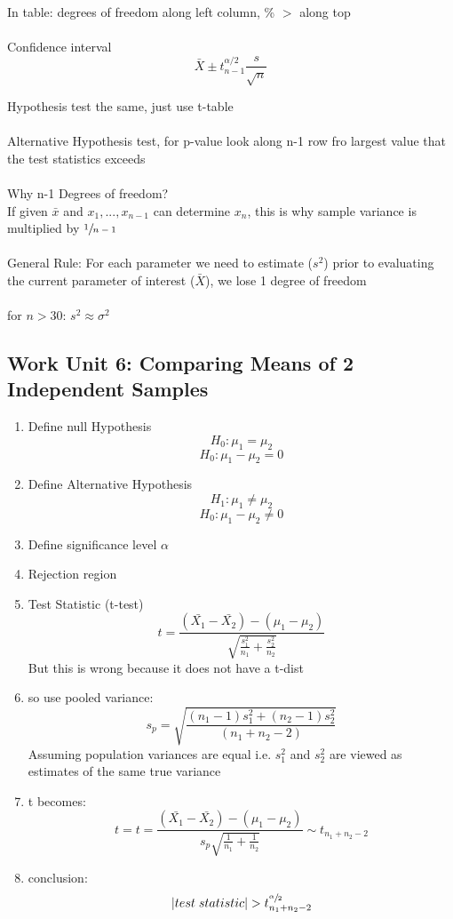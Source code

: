 \documentclass[a4paper,10pt]{article}
\begin{document}
In table: degrees of freedom along left column, \% $>$ along top \\ \\ Confidence interval \[
	\bar{X} \pm t_{n-1}^{\alpha/2}\frac{s}{\sqrt{n}}
\]

Hypothesis test the same, just use t-table \\ \\  Alternative Hypothesis test, for p-value look along n-1 row fro largest value that the test statistics exceeds \\ \\ Why n-1 Degrees of freedom? \\ If given $\bar{x}$ and $x_1, ..., x_{n-1}$ can determine $x_n$, this is why sample variance is multiplied by $\sfrac{1}{n-1}$ \\ \\ General Rule: For each parameter we need to estimate ($s^2$) prior to evaluating the current parameter of interest ($\bar{X}$), we lose 1 degree of freedom \\ \\

for $n>30$: $s^2 \approx \sigma^2$


\subsection{Work Unit 6: Comparing Means of 2 Independent Samples}

\begin{enumerate}
	\item Define null Hypothesis \[H_0: \mu_1 = \mu_2\] \[H_0: \mu_1 - \mu_2 = 0\]
	\item Define Alternative Hypothesis \[H_1: \mu_1 \neq \mu_2\] \[H_0: \mu_1 - \mu_2 \neq 0\]
	\item Define significance level $\alpha$
	\item Rejection region
	\item Test Statistic (t-test) \[t = \frac{(\bar{X_1}-\bar{X_2}) - (\mu_1-\mu_2)}{\sqrt{\frac{s_1^2}{n_1}+\frac{s_2^2}{n_2}}}\] But this is wrong because it does not have a t-dist
	\item so use pooled variance: \[ s_p = \sqrt{\frac{(n_1-1)s_1^2+(n_2-1)s_2^2}{(n_1+n_2 - 2)}} \] Assuming population variances are equal i.e. $s_1^2$ and $s_2^2$ are viewed as estimates of the same true variance
	\item t becomes: \[ t =  t = \frac{(\bar{X_1}-\bar{X_2}) - (\mu_1-\mu_2)}{s_p\sqrt{\frac{1}{n_1}+\frac{1}{n_2}}} \sim t_{n_1+n_2-2}\]
	\item conclusion: \[ |test \; statistic| > t^{\sfrac{\alpha}{2}}_{n_1+n_2-2}\]
\end{enumerate}
\end{document}
